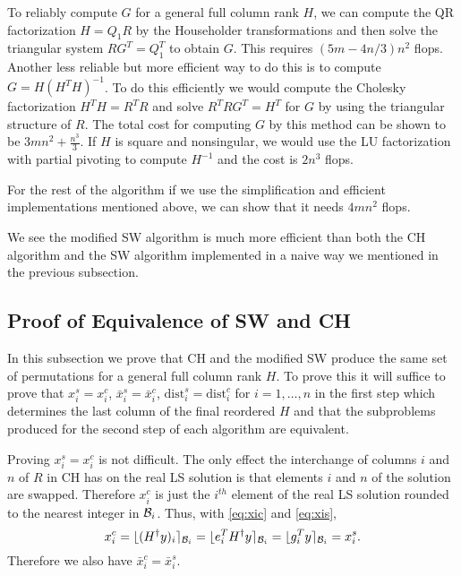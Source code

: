 \documentclass[12pt,Bold,letterpaper]{mcgilletdclass}
\newcommand{\be}{\begin{equation}}
\newcommand{\ee}{\end{equation}}
\newcommand{\dist}{\mathrm{dist}}
\begin{document}
To reliably compute $G$ for a general full column rank $H$,
we can compute the  QR factorization $H=Q_1R$ by the Householder transformations
and then solve the triangular system  $RG^T=Q_1^T$ to obtain $G$.
This requires $(5m-4n/3)n^2$ flops. 
Another less reliable but more efficient way to do this is to compute $G=H(H^TH)^{-1}$. 
To do this efficiently we would compute the Cholesky factorization  $H^TH = R^TR$ and solve 
$R^TRG^T = H^T$ for $G$ by using the triangular structure of $R$. 
The total cost for computing $G$ by this method can be shown to be $3mn^2+\frac{n^3}{3}$.
If $H$ is square and nonsingular, we would use the LU factorization with partial pivoting to compute $H^{-1}$
and the cost is $2n^3$ flops.

For the rest of the algorithm if we use the simplification and efficient implementations
mentioned above, we can show that it needs $4mn^2$ flops. 

We see the modified SW algorithm is much more efficient than both the CH algorithm
and the SW algorithm implemented in a naive way we mentioned in the previous subsection.

\subsection{Proof of Equivalence of SW and CH}
In this subsection we prove that  CH and  the modified  SW produce the same set of permutations
for a general full column rank $H$.
To prove this it will suffice to prove that $x_i^s = x_i^c$, $\bar{x}_i^s =\bar{x}_i^c$,
$\dist_i^s = \dist_i^c$ for $i=1, \ldots, n$ in the first step which determines the last column of the final reordered $H$
and that the subproblems produced for the second step of
each algorithm are equivalent. 

Proving $x_i^s = x_i^c$ is not difficult.
The only effect the interchange of columns $i$  and $n$ of $R$ in CH  
has on the real LS solution is that elements $i$ and $n$ of the solution are swapped.
Therefore $x_i^c$ is just the $i^{th}$ element of the real LS
solution rounded to the nearest integer in ${{\cal B}_i }$. 
Thus, with \eqref{eq:xic} and \eqref{eq:xis},
\be
x_i^c=   \lfloor (H^{\dagger}y)_i  \rceil_{{\cal B}_i }
=  \lfloor e_i^T H^{\dagger}y   \rceil_{{\cal B}_i }
=  \lfloor g_i^T  y \rceil_{{\cal B}_i } =x_i^s.
\label{eq:xics}
\ee
Therefore we also have $\bar{x}_i^c=\bar{x}_i^s$.
\end{document}
